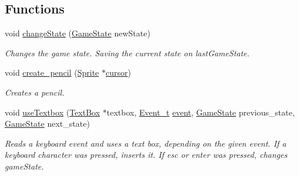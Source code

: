 \subsection*{Functions}
\begin{DoxyCompactItemize}
\item 
void \mbox{\hyperlink{group__game__state_ga903c5ec1f682a02fdf7213d99031ff8b}{change\+State}} (\mbox{\hyperlink{group__game__state_ga7899b65f1ea0f655e4bbf8d2a5714285}{Game\+State}} new\+State)
\begin{DoxyCompactList}\small\item\em Changes the game state. Saving the current state on last\+Game\+State. \end{DoxyCompactList}\item 
void \mbox{\hyperlink{group__game__state_ga91d8df875d55d73e7d41279389adc390}{create\+\_\+pencil}} (\mbox{\hyperlink{struct_sprite}{Sprite}} $\ast$\mbox{\hyperlink{pengoo_8c_a3a7ea4305773abf5347bb261a8a5c16b}{cursor}})
\begin{DoxyCompactList}\small\item\em Creates a pencil. \end{DoxyCompactList}\item 
void \mbox{\hyperlink{group__game__state_gab772180defa55e98f9b659c0c72e18d1}{use\+Textbox}} (\mbox{\hyperlink{struct_text_box}{Text\+Box}} $\ast$textbox, \mbox{\hyperlink{struct_event__t}{Event\+\_\+t}} \mbox{\hyperlink{pengoo_8c_af662780d461acf9ac3b1321884e7cb01}{event}}, \mbox{\hyperlink{group__game__state_ga7899b65f1ea0f655e4bbf8d2a5714285}{Game\+State}} previous\+\_\+state, \mbox{\hyperlink{group__game__state_ga7899b65f1ea0f655e4bbf8d2a5714285}{Game\+State}} next\+\_\+state)
\begin{DoxyCompactList}\small\item\em Reads a keyboard event and uses a text box, depending on the given event. If a keyboard character was pressed, inserts it. If esc or enter was pressed, changes game\+State. \end{DoxyCompactList}\end{DoxyCompactItemize}
